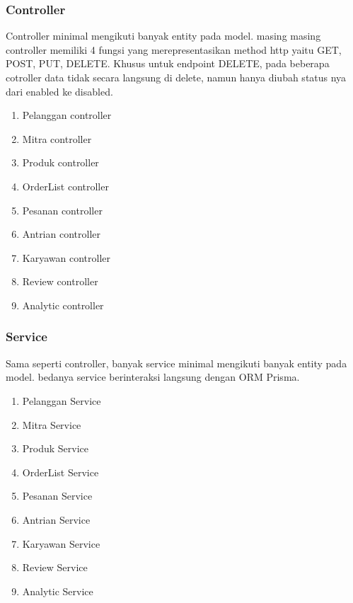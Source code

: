 \subsubsection{Controller}
Controller minimal mengikuti banyak entity pada model. masing masing controller memiliki 4 fungsi yang merepresentasikan method http yaitu GET, POST, PUT, DELETE. Khusus untuk endpoint DELETE, pada beberapa cotroller data tidak secara langsung di delete, namun hanya diubah status nya dari enabled ke disabled.
\begin{enumerate}
  \item Pelanggan controller
  \item Mitra controller
  \item Produk controller
  \item OrderList controller
  \item Pesanan controller
  \item Antrian controller
  \item Karyawan controller
  \item Review controller
  \item Analytic controller
\end{enumerate}

\subsubsection{Service}
Sama seperti controller, banyak service minimal mengikuti banyak entity pada model.
bedanya service berinteraksi langsung dengan ORM Prisma.
\begin{enumerate}
  \item Pelanggan Service
  \item Mitra Service
  \item Produk Service
  \item OrderList Service
  \item Pesanan Service
  \item Antrian Service
  \item Karyawan Service
  \item Review Service
  \item Analytic Service
\end{enumerate}

